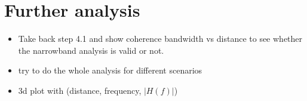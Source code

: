 \documentclass[10pt,a4paper]{ULBreport}
\begin{document}
\chapter{Further analysis}
\begin{itemize}
    \item Take back step 4.1 and show coherence bandwidth vs distance to see whether the narrowband analysis is valid or not.
    \item try to do the whole analysis for different scenarios
    \item 3d plot with (distance, frequency, $|H(f)|$)
\end{itemize}



\end{document}
